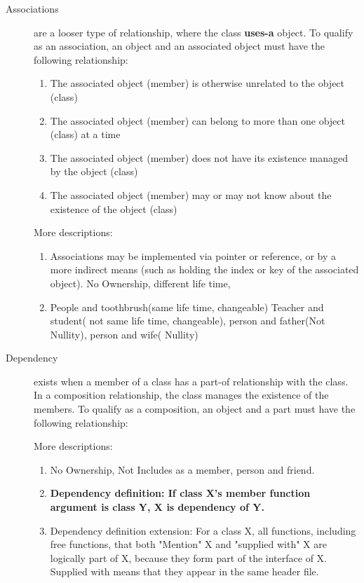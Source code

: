 \documentclass[a4paper,11pt,twoside]{book}
\begin{document}
\begin{itemize}
\begin{description}
	\item[Associations  ] are a looser type of relationship, where the class \textbf{uses-a} object. To qualify as an association, an object and an associated object must have the following relationship:
	\begin{enumerate}
		\item The associated object (member) is otherwise unrelated to the object (class)
		\item The associated object (member) can belong to more than one object (class) at a time
		\item The associated object (member) does not have its existence managed by the object (class)
		\item The associated object (member) may or may not know about the existence of the object (class)
	\end{enumerate}
	More descriptions:
	\begin{enumerate}
		\item Associations may be implemented via pointer or reference, or by a more indirect means (such as holding the index or key of the associated object). No Ownership, different life time,
		
		\item People and toothbrush(same life time, changeable) Teacher and student( not same life time, changeable), person and father(Not Nullity), person and wife( Nullity)
	\end{enumerate}

	\item[Dependency ] exists when a member of a class has a part-of relationship with the class. In a composition relationship, the class manages the existence of the members. To qualify as a composition, an object and a part must have the following relationship:
	
	More descriptions:
	\begin{enumerate}
		\item No Ownership, Not Includes as a member, person and friend.
		
		\item \textbf{Dependency definition: If class X's member function argument is class Y, X is dependency of Y.}
		
		\item Dependency definition extension: For a class X, all functions, including free functions, that both "Mention" X and "supplied with" X are logically part of X, because they form part of the interface of X. Supplied with means that they appear in the same header file.
	\end{enumerate}


\end{description}
\end{itemize}
\end{document}
